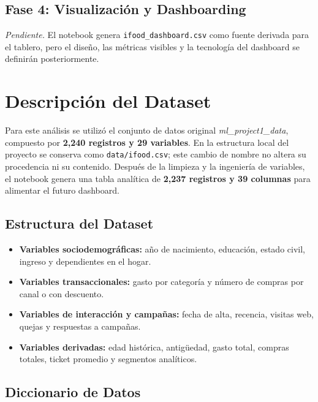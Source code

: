 \documentclass[12pt]{article}
\begin{document}
\subsection*{Fase 4: Visualización y Dashboarding}

\textit{Pendiente.} El notebook genera \texttt{ifood\_dashboard.csv} como fuente derivada para el tablero, pero el diseño, las métricas visibles y la tecnología del dashboard se definirán posteriormente.

\section*{Descripción del Dataset}

Para este análisis se utilizó el conjunto de datos original \textit{ml\_project1\_data}, compuesto por \textbf{2{,}240 registros y 29 variables}. En la estructura local del proyecto se conserva como \texttt{data/ifood.csv}; este cambio de nombre no altera su procedencia ni su contenido. Después de la limpieza y la ingeniería de variables, el notebook genera una tabla analítica de \textbf{2{,}237 registros y 39 columnas} para alimentar el futuro dashboard.

\subsection*{Estructura del Dataset}

\begin{itemize}[leftmargin=1.5em, itemsep=0.4em]
    \item \textbf{Variables sociodemográficas:} año de nacimiento, educación, estado civil, ingreso y dependientes en el hogar.
    \item \textbf{Variables transaccionales:} gasto por categoría y número de compras por canal o con descuento.
    \item \textbf{Variables de interacción y campañas:} fecha de alta, recencia, visitas web, quejas y respuestas a campañas.
    \item \textbf{Variables derivadas:} edad histórica, antigüedad, gasto total, compras totales, ticket promedio y segmentos analíticos.
\end{itemize}

\subsection*{Diccionario de Datos}
\end{document}
